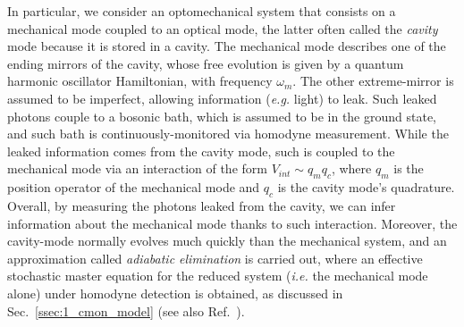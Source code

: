 In particular, we consider an optomechanical system that consists on a mechanical mode coupled to an optical mode, the latter often called the \textit{cavity} mode because it is stored in a cavity. The mechanical mode describes one of the ending mirrors of the cavity, whose free evolution is given by a quantum harmonic oscillator Hamiltonian, with frequency $\omega_m$. The other extreme-mirror is assumed to be imperfect, allowing information (\textit{e.g.} light) to leak. Such leaked photons couple to a bosonic bath, which is assumed to be in the ground state, and such bath is continuously-monitored via homodyne measurement. While the leaked information comes from the cavity mode, such is coupled to the mechanical mode via an interaction of the form $V_{int}\sim q_m q_c$, where $q_m$ is the position operator of the mechanical mode and $q_c$ is the cavity mode's quadrature. Overall, by measuring the photons leaked from the cavity, we can infer information about the mechanical mode thanks to such interaction. Moreover, the cavity-mode normally evolves much quickly than the mechanical system, and an approximation called \textit{adiabatic elimination} is carried out, where an effective stochastic master equation for the reduced system (\textit{i.e.} the mechanical mode alone) under homodyne detection is obtained, as discussed in Sec.~\ref{ssec:1_cmon_model} (see also Ref.~\cite{doherty1999feedback}).

